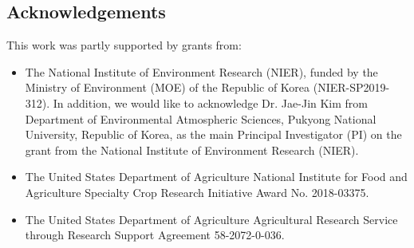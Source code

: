 

\subsection{Acknowledgements}

This work was partly supported by grants from:

\begin{itemize}

\item The National Institute of Environment Research (NIER), funded by the Ministry of Environment (MOE) of the Republic of Korea (NIER-SP2019-312). In addition, we would like to acknowledge Dr. Jae-Jin Kim from Department of Environmental Atmospheric Sciences, Pukyong National University, Republic of Korea, as the main Principal Investigator (PI) on the grant from the National Institute of Environment Research (NIER).

\item The United States Department of Agriculture National Institute for Food and Agriculture Specialty Crop Research Initiative Award No. 2018-03375.

\item The United States Department of Agriculture Agricultural Research Service through Research Support Agreement 58-2072-0-036.

\end{itemize}
